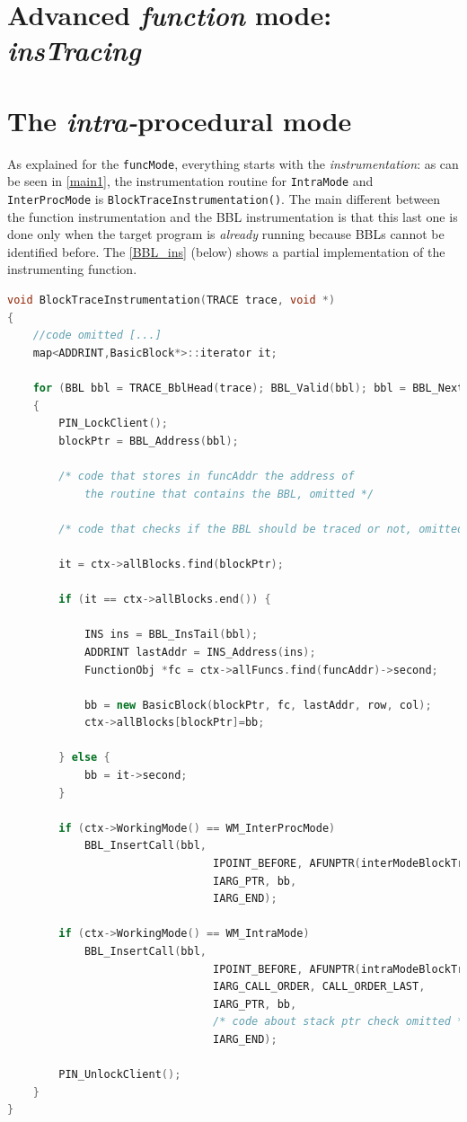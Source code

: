 \documentclass[a4paper,10pt]{report}
\begin{document}
\section{Advanced \emph{function} mode: \emph{insTracing}}

\section{The \emph{intra-}procedural mode}

As explained for the \verb|funcMode|, everything starts with the \emph{instrumentation}:
as can be seen in \cref{main1}, the instrumentation routine for \verb|IntraMode| and \verb|InterProcMode| is \verb|BlockTraceInstrumentation()|. The main different between the 
function instrumentation and the BBL instrumentation is that this last one is done
only when the target program is \emph{already} running because BBLs cannot be 
identified before. The \cref{BBL_ins} (below) shows a partial implementation of the instrumenting function.


\begin{lstlisting}[language=C++, 
	caption={partial implementation of \texttt{BlockTraceInstrumentation()}}, 
	label=BBL_ins, frame=leftline, showstringspaces=false]
void BlockTraceInstrumentation(TRACE trace, void *)
{
	//code omitted [...]
	map<ADDRINT,BasicBlock*>::iterator it;

    for (BBL bbl = TRACE_BblHead(trace); BBL_Valid(bbl); bbl = BBL_Next(bbl))
    {
		PIN_LockClient();
 		blockPtr = BBL_Address(bbl);

		/* code that stores in funcAddr the address of 
			the routine that contains the BBL, omitted */

		/* code that checks if the BBL should be traced or not, omitted */

		it = ctx->allBlocks.find(blockPtr);

		if (it == ctx->allBlocks.end()) {

			INS ins = BBL_InsTail(bbl);
			ADDRINT lastAddr = INS_Address(ins);
			FunctionObj *fc = ctx->allFuncs.find(funcAddr)->second;

			bb = new BasicBlock(blockPtr, fc, lastAddr, row, col); 
			ctx->allBlocks[blockPtr]=bb;

		} else {		
			bb = it->second;
		}

		if (ctx->WorkingMode() == WM_InterProcMode)
			BBL_InsertCall(bbl, 
								IPOINT_BEFORE, AFUNPTR(interModeBlockTrace), 
								IARG_PTR, bb, 
								IARG_END);		

		if (ctx->WorkingMode() == WM_IntraMode)
			BBL_InsertCall(bbl, 
								IPOINT_BEFORE, AFUNPTR(intraModeBlockTrace), 
								IARG_CALL_ORDER, CALL_ORDER_LAST, 
								IARG_PTR, bb, 
								/* code about stack ptr check omitted */
								IARG_END);		

		PIN_UnlockClient();
    }
}

\end{lstlisting}
\end{document}
